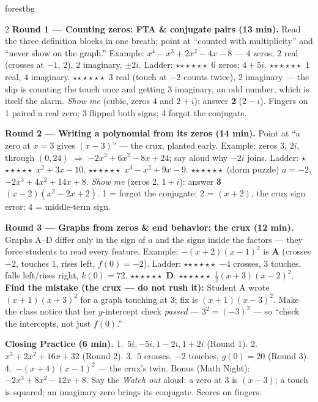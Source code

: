 \documentclass[10pt]{article}
\newcommand{\rung}[1]{{\color{goldacc}\ifcase#1\or$\star$\or$\star\star$\or$\star\star\star$\fi}}
\begin{document}
\begin{skillbox}{forestbg}
\begin{multicols}{2}
\textbf{Round 1 --- Counting zeros: FTA \& conjugate pairs (13 min).} Read the three definition
blocks in one breath; point at ``counted with multiplicity'' and ``never show on the graph.''
Example: $x^4-x^3+2x^2-4x-8$ --- $4$ zeros, $2$ real (crosses at $-1$, $2$), $2$ imaginary,
$\pm2i$. Ladder: \rung1\ $6$ zeros; $4+5i$. \rung2\ $1$ real, $4$ imaginary. \rung3\ $3$ real
(touch at $-2$ counts twice), $2$ imaginary --- the slip is counting the touch once and getting
$3$ imaginary, an odd number, which is itself the alarm. \emph{Show me} (cubic, zeros $4$ and
$2+i$): answer \textbf{2} ($2-i$). Fingers on 1 paired a real zero; 3 flipped both signs;
4 forgot the conjugate.

\textbf{Round 2 --- Writing a polynomial from its zeros (14 min).} Point at ``a zero at $x=3$
gives $(x-3)$'' --- the crux, planted early. Example: zeros $3$, $2i$, through $(0,24)$ $\Rightarrow$
$-2x^3+6x^2-8x+24$; say aloud why $-2i$ joins. Ladder: \rung1\ $x^2+3x-10$. \rung2\
$x^3-x^2+9x-9$. \rung3\ (dorm puzzle) $a=-2$, $-2x^3+4x^2+14x+8$. \emph{Show me} (zeros $2$,
$1+i$): answer \textbf{3} $(x-2)(x^2-2x+2)$. 1 = forgot the conjugate; 2 = $(x+2)$, the crux
sign error; 4 = middle-term sign.

\columnbreak
\textbf{Round 3 --- Graphs from zeros \& end behavior: the crux (12 min).} Graphs A--D differ
only in the sign of $a$ and the signs inside the factors --- they force students to read every
feature. Example: $-(x+2)(x-1)^2$ is \textbf{A} (crosses $-2$, touches $1$, rises left, $f(0)=-2$).
Ladder: \rung1\ $-4$ crosses, $3$ touches, falls left/rises right, $k(0)=72$. \rung2\ \textbf{D}.
\rung3\ $\tfrac12(x+3)(x-2)^2$. \textbf{Find the mistake (the crux --- do not rush it):} Student A
wrote $(x+1)(x+3)^2$ for a graph touching at $3$; fix is $(x+1)(x-3)^2$. Make the class notice that
her $y$-intercept check \emph{passed} --- $3^2=(-3)^2$ --- so ``check the intercepts, not just
$f(0)$.''

\textbf{Closing Practice (6 min).} 1.\ $5i,-5i,1-2i,1+2i$ (Round 1). 2.\ $x^3+2x^2+16x+32$
(Round 2). 3.\ $5$ crosses, $-2$ touches, $g(0)=20$ (Round 3). 4.\ $-(x+4)(x-1)^2$ --- the
crux's twin. Bonus (Math Night): $-2x^3+8x^2-12x+8$. Say the \emph{Watch out} aloud: a zero at
$3$ is $(x-3)$; a touch is squared; an imaginary zero brings its conjugate. Scores on fingers.
\end{multicols}
\end{skillbox}
\end{document}
